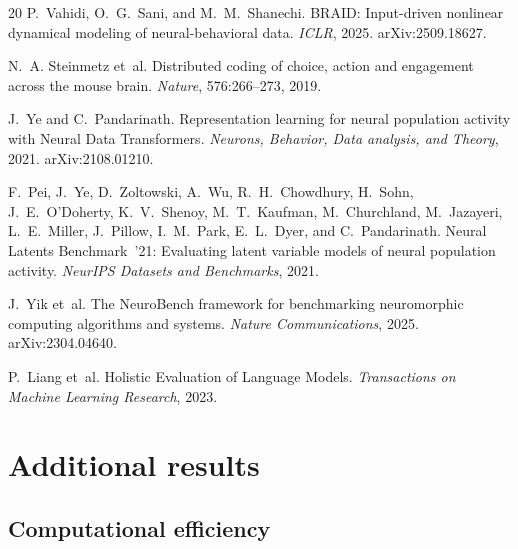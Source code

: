 \documentclass{article}
\begin{document}
{\begin{thebibliography}{20}
P.~Vahidi, O.~G.~Sani, and M.~M.~Shanechi.
\newblock BRAID: Input-driven nonlinear dynamical modeling of
  neural-behavioral data.
\newblock \emph{ICLR}, 2025.  arXiv:2509.18627.

N.~A. Steinmetz et~al.
\newblock Distributed coding of choice, action and engagement across
  the mouse brain.
\newblock \emph{Nature}, 576:266--273, 2019.

J.~Ye and C.~Pandarinath.
\newblock Representation learning for neural population activity with
  Neural Data Transformers.
\newblock \emph{Neurons, Behavior, Data analysis, and Theory}, 2021.
  arXiv:2108.01210.

F.~Pei, J.~Ye, D.~Zoltowski, A.~Wu, R.~H.~Chowdhury, H.~Sohn,
  J.~E.~O'Doherty, K.~V.~Shenoy, M.~T.~Kaufman, M.~Churchland,
  M.~Jazayeri, L.~E.~Miller, J.~Pillow, I.~M.~Park, E.~L.~Dyer,
  and C.~Pandarinath.
\newblock Neural Latents Benchmark~'21: Evaluating latent variable
  models of neural population activity.
\newblock \emph{NeurIPS Datasets and Benchmarks}, 2021.

J.~Yik et~al.
\newblock The NeuroBench framework for benchmarking neuromorphic
  computing algorithms and systems.
\newblock \emph{Nature Communications}, 2025.  arXiv:2304.04640.

P.~Liang et~al.
\newblock Holistic Evaluation of Language Models.
\newblock \emph{Transactions on Machine Learning Research}, 2023.

\end{thebibliography}
}


\appendix

\section{Additional results}
\label{sec:appendix}

\subsection{Computational efficiency}
\end{document}
